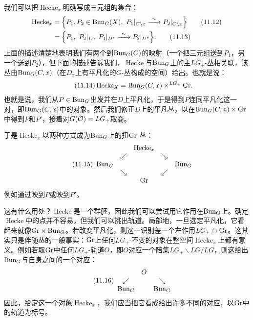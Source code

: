 我们可以把$\operatorname{Hecke}_x$明确写成三元组的集合：
\begin{align}
\operatorname{Hecke}_x&=\Bigl\{P_1,P_2\in\Bun_G(X),\ P_1|_{C\setminus x}\xrightarrow{\ \sim\ }P_2|_{C\setminus x}\Bigr\}\tag{11.12}\\
&=\Bigl\{P_1,\ P_2|_{D},\ P_1|_{D^{*}}\xrightarrow{\ \sim\ }P_2|_{D^{*}}\Bigr\}.\tag{11.13}
\end{align}
上面的描述清楚地表明我们有两个到$\mathrm{Bun}_G(C)$的映射（一个把三元组送到$P_1$，另一个送到$P_2$），但下面的描述告诉我们，$\operatorname{Hecke}$与$\mathrm{Bun}_G$上的主$LG_+$-丛相关联，该丛由$\mathrm{Bun}_G(C,x)$（在$D_x$上有平凡化的$G$-丛构成的空间）给出。也就是说：
\begin{equation}\tag{11.14}
\operatorname{Hecke}_X=\mathrm{Bun}_G(C,x)\times^{LG_+}\mathrm{Gr}.
\end{equation}
也就是说，我们从$P\in\mathrm{Bun}_G$出发并在$D$上平凡化，于是得到$P$连同平凡化这一对，即$\mathrm{Bun}_G(C,x)$中的对象。然后我们修正$D$上的平凡丛，以在$\mathrm{Bun}_G(C,x)\times\mathrm{Gr}$中得到$P$和$P'$，接着对$G(\mathcal{O})=LG_+$取商。

于是$\operatorname{Hecke}_x$以两种方式成为$\mathrm{Bun}_G$上的扭$\mathrm{Gr}$-丛：
\begin{equation}\tag{11.15}
\begin{array}{ccccc}
 & & \operatorname{Hecke}_x & & \\
 & \swarrow & & \searrow & \\
\mathrm{Bun}_G & & & & \mathrm{Bun}_G\\
 & \searrow & & \swarrow & \\
 & & \mathrm{Gr} & &
\end{array}
\end{equation}
例如通过映到$P$或映到$P'$。

这有什么用处？$\operatorname{Hecke}$是一个群胚，因此我们可以尝试用它作用在$\mathrm{Bun}_G$上。确定$\operatorname{Hecke}$中的点并不容易，但我们可以挑出轨道。局部地，一旦选定平凡化，它看起来就像$\mathrm{Gr}\times\mathrm{Bun}_G$。若改变平凡化，则这一识别差一个左作用$LG_+\circlearrowright\mathrm{Gr}$。这其实只是伴随丛的一般事实：$\mathrm{Gr}$上任何$LG_+$-不变的对象在整空间$\operatorname{Hecke}_x$上都有意义。例如若取$\mathrm{Gr}$中任何$LG_+$-轨道$O$，即$O$对应一个陪集$LG_+\backslash LG/LG$，则这给出$\mathrm{Bun}_G$与自身之间的一个对应：
\begin{equation}\tag{11.16}
\begin{array}{ccc}
 & O & \\
 \swarrow & & \searrow\\
 \mathrm{Bun}_G & & \mathrm{Bun}_G
\end{array}
\end{equation}
因此，给定这一个对象$\operatorname{Hecke}_x$，我们应当把它看成给出许多不同的对应，以$\mathrm{Gr}$中的轨道为标号。

